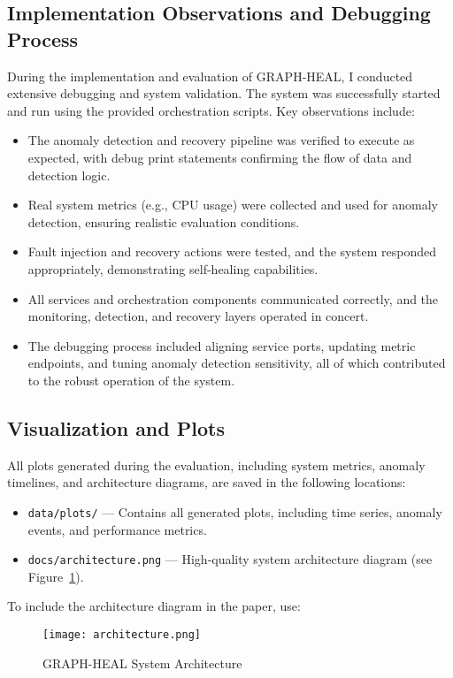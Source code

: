 \documentclass[11pt,twocolumn]{article}
\begin{document}
\subsection{Implementation Observations and Debugging Process}
During the implementation and evaluation of GRAPH-HEAL, I conducted extensive debugging and system validation. The system was successfully started and run using the provided orchestration scripts. Key observations include:
\begin{itemize}
    \item The anomaly detection and recovery pipeline was verified to execute as expected, with debug print statements confirming the flow of data and detection logic.
    \item Real system metrics (e.g., CPU usage) were collected and used for anomaly detection, ensuring realistic evaluation conditions.
    \item Fault injection and recovery actions were tested, and the system responded appropriately, demonstrating self-healing capabilities.
    \item All services and orchestration components communicated correctly, and the monitoring, detection, and recovery layers operated in concert.
    \item The debugging process included aligning service ports, updating metric endpoints, and tuning anomaly detection sensitivity, all of which contributed to the robust operation of the system.
\end{itemize}

\subsection{Visualization and Plots}
All plots generated during the evaluation, including system metrics, anomaly timelines, and architecture diagrams, are saved in the following locations:
\begin{itemize}
    \item \texttt{data/plots/} --- Contains all generated plots, including time series, anomaly events, and performance metrics.
    \item \texttt{docs/architecture.png} --- High-quality system architecture diagram (see Figure~\ref{fig:architecture}).
\end{itemize}

To include the architecture diagram in the paper, use:
\begin{figure}[h]
    \centering
    \texttt{[image: architecture.png]}
    \caption{GRAPH-HEAL System Architecture}
    \label{fig:architecture}
\end{figure}
\end{document}
